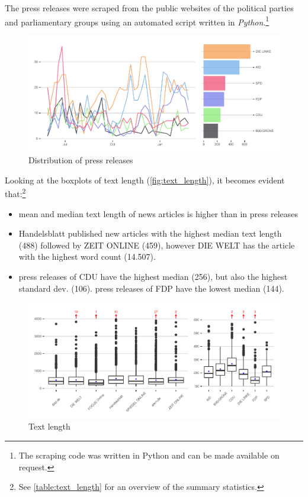 \documentclass[
]{article}
\providecommand{\tightlist}{%
  \setlength{\itemsep}{0pt}\setlength{\parskip}{0pt}}
\begin{document}
The press releases were scraped from the public websites of the
political parties and parliamentary groups using an automated script
written in \emph{Python}.\footnote{The scraping code was written in
  Python and can be made available on request.}

\begin{figure}

{\centering \includegraphics[width=0.9\linewidth]{main_text_files/figure-latex/press releases-1} 

}

\caption{Distribution of press releases \label{fig:press_distr}}\label{fig:press releases}
\end{figure}

Looking at the boxplots of text length (\autoref{fig:text_length}), it
becomes evident that:\footnote{See \autoref{table:text_length} for an
  overview of the summary statistics.}

\begin{itemize}
\tightlist
\item
  mean and median text length of news articles is higher than in press
  releases
\item
  Handelsblatt published new articles with the highest median text
  length (488) followed by ZEIT ONLINE (459), however DIE WELT has the
  article with the highest word count (14.507).
\item
  press releases of CDU have the highest median (256), but also the
  highest standard dev. (106). press releases of FDP have the lowest
  median (144).
\end{itemize}

\begin{figure}

{\centering \includegraphics[width=1\linewidth]{main_text_files/figure-latex/text_length-1} 

}

\caption{Text length \label{fig:text_length}}\label{fig:text_length}
\end{figure}
\end{document}
